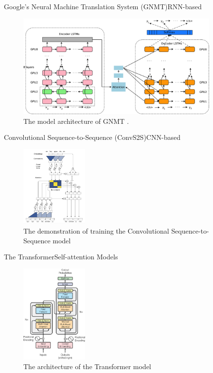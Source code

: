 \documentclass[11pt]{beamer}
\begin{document}
\begin{frame}{Google's Neural Machine Translation System (GNMT)}{RNN-based}
    \begin{figure}[h]
        \includegraphics[width=0.9\textwidth]{gnmt-architecture}
        \centering
        \caption{The model architecture of GNMT \cite{Wu2016}.}
        \label{figure:gnmt architecture}
    \end{figure}
\end{frame}

\begin{frame}{Convolutional Sequence-to-Sequence (ConvS2S)}{CNN-based}
    \begin{figure}[h]
        \includegraphics[width=0.3\textwidth]{convs2s-architecture}
        \centering
        \caption{The demonstration of training the Convolutional Sequence-to-Sequence model \cite{gehring2017convs2s}}
        \label{figure:convs2s model}
    \end{figure}
\end{frame}

\begin{frame}{The Transformer}{Self-attention Models}
    \begin{figure}[h]
        \includegraphics[width=0.3\textwidth]{transformer-architecture}
        \centering
        \caption{The architecture of the Transformer model \cite{Vaswani2017}}
        \label{figure:transformer model}
    \end{figure}
\end{frame}
\end{document}

